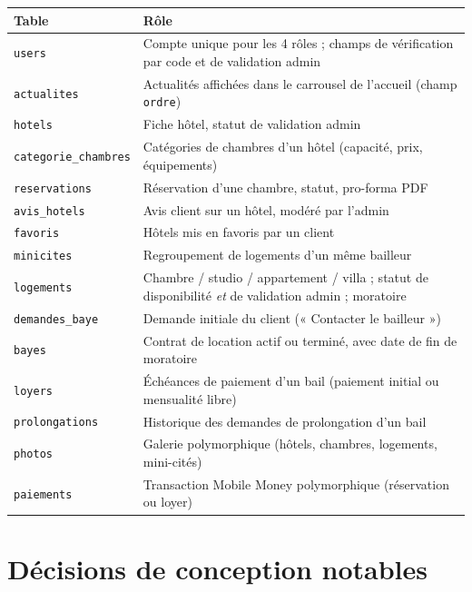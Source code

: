 \documentclass[11pt,a4paper]{report}
\newcommand{\tech}[1]{\texttt{\small #1}}
\begin{document}
\begin{longtable}{p{3.6cm}p{10.7cm}}
\toprule
\textbf{Table} & \textbf{Rôle} \\
\midrule
\endhead
\tech{users} & Compte unique pour les 4 rôles ; champs de vérification par code et de validation admin \\
\tech{actualites} & Actualités affichées dans le carrousel de l'accueil (champ \tech{ordre}) \\
\tech{hotels} & Fiche hôtel, statut de validation admin \\
\tech{categorie\_chambres} & Catégories de chambres d'un hôtel (capacité, prix, équipements) \\
\tech{reservations} & Réservation d'une chambre, statut, pro-forma PDF \\
\tech{avis\_hotels} & Avis client sur un hôtel, modéré par l'admin \\
\tech{favoris} & Hôtels mis en favoris par un client \\
\tech{minicites} & Regroupement de logements d'un même bailleur \\
\tech{logements} & Chambre / studio / appartement / villa ; statut de disponibilité \emph{et} de validation admin ; moratoire \\
\tech{demandes\_baye} & Demande initiale du client (« Contacter le bailleur ») \\
\tech{bayes} & Contrat de location actif ou terminé, avec date de fin de moratoire \\
\tech{loyers} & Échéances de paiement d'un bail (paiement initial ou mensualité libre) \\
\tech{prolongations} & Historique des demandes de prolongation d'un bail \\
\tech{photos} & Galerie polymorphique (hôtels, chambres, logements, mini-cités) \\
\tech{paiements} & Transaction Mobile Money polymorphique (réservation ou loyer) \\
\bottomrule
\end{longtable}

\section{Décisions de conception notables}
\end{document}
